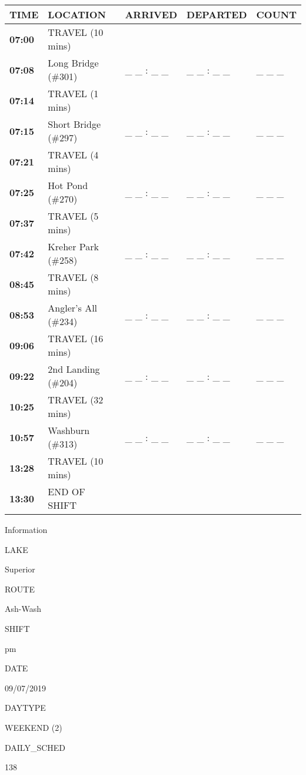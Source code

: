 \documentclass[]{article}
\begin{document}
\begin{tabular}{>{\bfseries}lllll}
\toprule
\textbf{TIME} & \textbf{LOCATION} & \textbf{ARRIVED} & \textbf{DEPARTED} & \textbf{COUNT}\\
\midrule
07:00 & TRAVEL (10 mins) &  &  & \\
07:08 & Long Bridge (\#301) & \_ \_ : \_ \_ & \_ \_ : \_ \_ & \_ \_ \_\\
07:14 & TRAVEL (1 mins) &  &  & \\
07:15 & Short Bridge (\#297) & \_ \_ : \_ \_ & \_ \_ : \_ \_ & \_ \_ \_\\
07:21 & TRAVEL (4 mins) &  &  & \\
07:25 & Hot Pond (\#270) & \_ \_ : \_ \_ & \_ \_ : \_ \_ & \_ \_ \_\\
07:37 & TRAVEL (5 mins) &  &  & \\
07:42 & Kreher Park (\#258) & \_ \_ : \_ \_ & \_ \_ : \_ \_ & \_ \_ \_\\
08:45 & TRAVEL (8 mins) &  &  & \\
08:53 & Angler's All (\#234) & \_ \_ : \_ \_ & \_ \_ : \_ \_ & \_ \_ \_\\
09:06 & TRAVEL (16 mins) &  &  & \\
09:22 & 2nd Landing (\#204) & \_ \_ : \_ \_ & \_ \_ : \_ \_ & \_ \_ \_\\
10:25 & TRAVEL (32 mins) &  &  & \\
10:57 & Washburn (\#313) & \_ \_ : \_ \_ & \_ \_ : \_ \_ & \_ \_ \_\\
13:28 & TRAVEL (10 mins) &  &  & \\
13:30 & END OF SHIFT &  &  & \\
\bottomrule
\end{tabular}\newpage

Information

LAKE

Superior

ROUTE

Ash-Wash

SHIFT

pm

DATE

09/07/2019

DAYTYPE

WEEKEND (2)

DAILY\_SCHED

138

\vspace{24pt}
\end{document}
